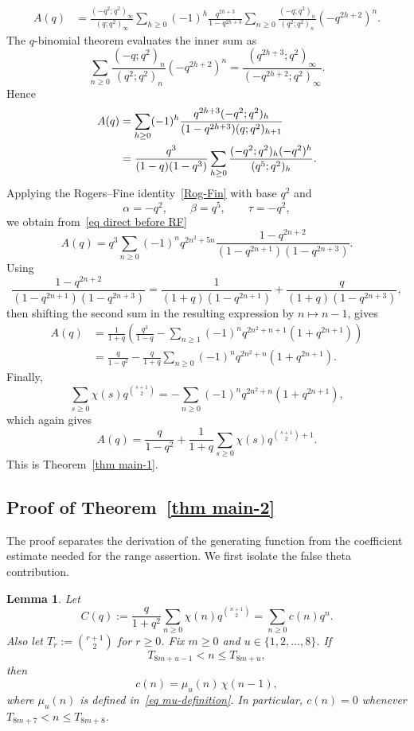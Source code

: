 \documentclass[reqno]{amsart}
\theoremstyle{definition}
\theoremstyle{plain}
\newtheorem{lemma}      {Lemma}
\theoremstyle{remark}
\numberwithin{equation}{section}
\begin{document}
\begin{align}
A(q)
&=\frac{(-q^2;q^2)_\infty}{(q;q^2)_\infty}
\sum_{h\ge0}(-1)^h\frac{q^{2h+3}}{1-q^{2h+3}}
\sum_{n\ge0}\frac{(-q;q^2)_n}{(q^2;q^2)_n}(-q^{2h+2})^n. \label{eq direct geom}
\end{align}
The $q$-binomial theorem evaluates the inner sum as
\[
\sum_{n\ge0}\frac{(-q;q^2)_n}{(q^2;q^2)_n}(-q^{2h+2})^n
=\frac{(q^{2h+3};q^2)_\infty}{(-q^{2h+2};q^2)_\infty}.
\]
Hence
\begin{align}
A(q)
&=\sum_{h\ge0}(-1)^h
\frac{q^{2h+3}(-q^2;q^2)_h}{(1-q^{2h+3})(q;q^2)_{h+1}} \notag\\
&=\frac{q^3}{(1-q)(1-q^3)}
\sum_{h\ge0}\frac{(-q^2;q^2)_h(-q^2)^h}{(q^5;q^2)_h}. \label{eq direct before RF}
\end{align}
Applying the Rogers--Fine identity~\eqref{Rog-Fin} with base $q^2$ and
\[
\alpha=-q^2,\qquad \beta=q^5,\qquad \tau=-q^2,
\]
we obtain from~\eqref{eq direct before RF}
\begin{equation}\label{eq direct after RF}
A(q)=q^3\sum_{n\ge0}(-1)^n q^{2n^2+5n}
\frac{1-q^{2n+2}}{(1-q^{2n+1})(1-q^{2n+3})}.
\end{equation}
Using
\[
\frac{1-q^{2n+2}}{(1-q^{2n+1})(1-q^{2n+3})}
=\frac{1}{(1+q)(1-q^{2n+1})}+\frac{q}{(1+q)(1-q^{2n+3})},
\]
then shifting the second sum in the resulting expression by $n\mapsto n-1$, gives
\begin{align*}
A(q)
&=\frac{1}{1+q}\left(\frac{q^3}{1-q}
-\sum_{n\ge1}(-1)^nq^{2n^2+n+1}(1+q^{2n+1})\right)\\
&=\frac{q}{1-q^2}-\frac{q}{1+q}
\sum_{n\ge0}(-1)^nq^{2n^2+n}(1+q^{2n+1}).
\end{align*}
Finally,
\[
\sum_{s\ge0}\chi(s)q^{\binom{s+1}{2}}
=-\sum_{n\ge0}(-1)^nq^{2n^2+n}(1+q^{2n+1}),
\]
which again gives
\[
A(q)=\frac{q}{1-q^2}+\frac{1}{1+q}\sum_{s\ge0}\chi(s)q^{\binom{s+1}{2}+1}.
\]
This is Theorem~\ref{thm main-1}.

%

\subsection{Proof of Theorem~\ref{thm main-2}}\label{sec proof main-2}
%
The proof separates the derivation of the generating function from the coefficient estimate needed for the range assertion.  We first isolate the false theta contribution.

\begin{lemma}\label{lem false theta block}
Let
\[
C(q):=\frac{q}{1+q^2}\sum_{n\ge 0}\chi(n)q^{\binom{n+1}{2}}=\sum_{n\ge 0} c(n)q^n.
\]
Also let $T_r:=\binom{r+1}{2}$ for $r\ge 0$.  Fix $m\ge 0$ and $u\in\{1,2,\dots,8\}$.  If
\[
T_{8m+u-1}<n\le T_{8m+u},
\]
then
\begin{equation}\label{eq exact c(n)}
c(n)=\mu_u(n)\,\chi(n-1),
\end{equation}
where $\mu_u(n)$ is defined in~\eqref{eq mu-definition}. In particular, $c(n)=0$ whenever $T_{8m+7}<n\le T_{8m+8}$.
\end{lemma}
\end{document}
